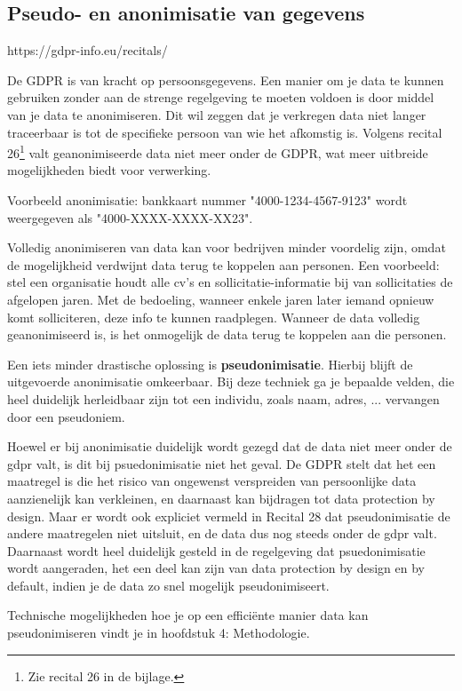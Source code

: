 \subsection{Pseudo- en anonimisatie van gegevens}
https://gdpr-info.eu/recitals/


De GDPR is van kracht op persoonsgegevens. Een manier om je data te kunnen gebruiken zonder aan de strenge regelgeving te moeten voldoen is door middel van je data te anonimiseren. Dit wil zeggen dat je verkregen data niet langer traceerbaar is tot de specifieke persoon van wie het afkomstig is. Volgens recital 26\footnote{Zie recital 26 in de bijlage.} valt geanonimiseerde data niet meer onder de GDPR, wat meer uitbreide mogelijkheden biedt voor verwerking. 

Voorbeeld anonimisatie: bankkaart nummer "4000-1234-4567-9123" wordt weergegeven als "4000-XXXX-XXXX-XX23". 

Volledig anonimiseren van data kan voor bedrijven minder voordelig zijn, omdat de mogelijkheid verdwijnt data terug te koppelen aan personen. Een voorbeeld: stel een organisatie houdt alle cv's en sollicitatie-informatie bij van sollicitaties de afgelopen jaren.
 Met de bedoeling, wanneer enkele jaren later iemand opnieuw komt solliciteren, deze info te kunnen raadplegen. Wanneer de data volledig geanonimiseerd is, is het onmogelijk de data terug te koppelen aan die personen. 
 
Een iets minder drastische oplossing is \textbf{pseudonimisatie}. Hierbij blijft de uitgevoerde anonimisatie omkeerbaar.  
Bij deze techniek ga je bepaalde velden, die heel duidelijk herleidbaar zijn tot een individu, zoals naam, adres, ... vervangen door een pseudoniem.

Hoewel er bij anonimisatie duidelijk wordt gezegd dat de data niet meer onder de gdpr valt, is dit bij psuedonimisatie niet het geval. De GDPR stelt dat het een maatregel is die het risico van ongewenst verspreiden van persoonlijke data aanzienelijk kan verkleinen, en daarnaast kan bijdragen tot data protection by design. Maar er wordt ook expliciet vermeld in Recital 28 dat pseudonimisatie de andere maatregelen niet uitsluit, en de data dus nog steeds onder de gdpr valt. 
Daarnaast wordt heel duidelijk gesteld in de regelgeving dat psuedonimisatie wordt aangeraden, het een deel kan zijn van data protection by design en by default, indien je de data zo snel mogelijk pseudonimiseert. 

Technische mogelijkheden hoe je op een efficiënte manier data kan pseudonimiseren vindt je in hoofdstuk 4: Methodologie. 





